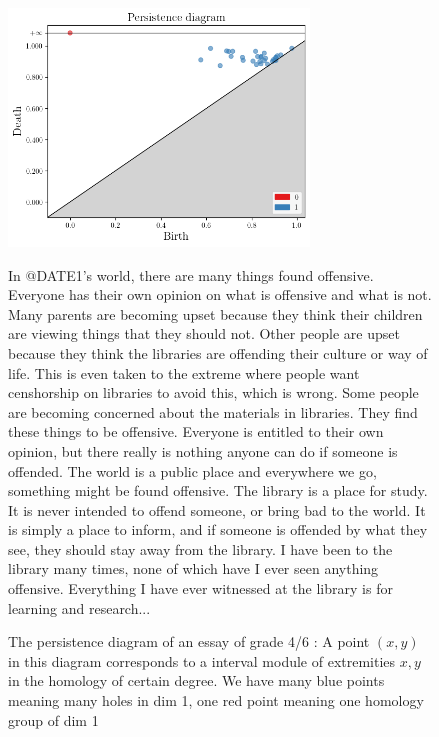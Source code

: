 \begin{figure}[H]
\begin{minipage}{0.49\linewidth}
\includegraphics[width=8cm]{pdessay.png}
\end{minipage}
\begin{minipage}{0.49\linewidth}
In @DATE1's world, there are many things found offensive.  Everyone has their own opinion on what is offensive and what is not. Many parents are becoming upset because they think their children are viewing things that they should not.  Other people are upset because they think the libraries are offending their culture or way of life.  This is even taken to the extreme where people want censhorship on libraries to avoid this, which is wrong.     Some people are becoming concerned about the materials in libraries.  They find these things to be offensive.  Everyone is entitled to their own opinion, but there really is nothing anyone can do if someone is offended.  The world is a public place and everywhere we go, something might be found offensive.  The library is a place for study.  It is never intended to offend someone, or bring bad to the world.  It is simply a place to inform, and if someone is offended by what they see, they should stay away from the library.     I have been to the library many times, none of which have I ever seen anything offensive.  Everything I have ever witnessed at the library is for learning and research...
\end{minipage}
\caption{The persistence diagram of an essay of grade 4/6 : A point $(x, y)$ in this diagram corresponds to
a interval module of extremities $x, y$ in the homology of certain degree.
We have many blue points meaning many holes in dim 1, one red point meaning
one homology group of dim 1
}
\label{fig:pd}
\end{figure}

